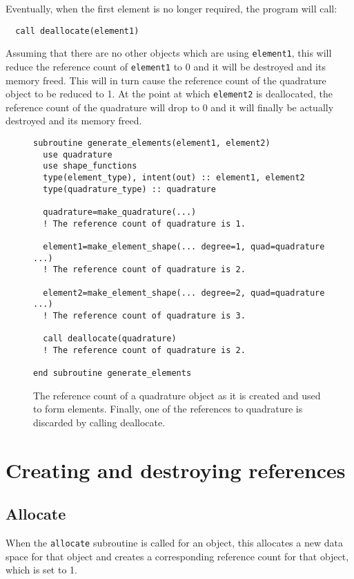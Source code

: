 \documentclass[a4paper, 11pt]{book}
\begin{document}
Eventually, when the first element is no longer required, the program will call:
\begin{lstlisting}
  call deallocate(element1)
\end{lstlisting}
Assuming that there are no other objects which are using
\lstinline+element1+, this will reduce the reference count of
\lstinline+element1+ to 0 and it will be destroyed and its memory freed.
This will in turn cause the reference count of the quadrature object to be
reduced to 1. At the point at which \lstinline+element2+ is deallocated, the
reference count of the quadrature will drop to 0 and it will finally be
actually destroyed and its memory freed.

\begin{figure}[ht]
  \begin{lstlisting}
subroutine generate_elements(element1, element2) 
  use quadrature 
  use shape_functions 
  type(element_type), intent(out) :: element1, element2
  type(quadrature_type) :: quadrature

  quadrature=make_quadrature(...)  
  ! The reference count of quadrature is 1.

  element1=make_element_shape(... degree=1, quad=quadrature ...)  
  ! The reference count of quadrature is 2.

  element2=make_element_shape(... degree=2, quad=quadrature ...)  
  ! The reference count of quadrature is 3.

  call deallocate(quadrature) 
  ! The reference count of quadrature is 2.

end subroutine generate_elements
  \end{lstlisting}
  \caption{The reference count of a quadrature object as it is created and used
  to form elements. Finally, one of the references to quadrature is
  discarded by calling deallocate.}
\label{fig:refcount}
\end{figure}

\section{Creating and destroying references}

\subsection{Allocate}

When the \lstinline+allocate+ subroutine is called for an object, this
allocates a new data space for that object and creates a corresponding
reference count for that object, which is set to 1. 
\end{document}
